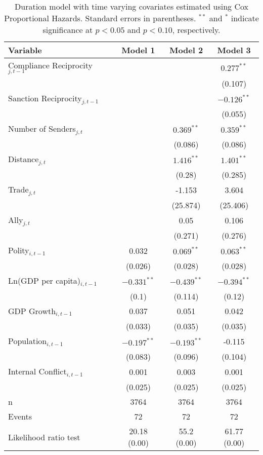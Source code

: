 \begin{table}[ht]
\centering
{\normalsize
\begin{tabular}{lccc}
 Variable & Model 1 & Model 2 & Model 3 \\ 
  \hline
\hline
Compliance Reciprocity$_{j,t-1}$ &  &  & $0.277^{\ast\ast}$ \\ 
   &  &  & (0.107) \\ 
  Sanction Reciprocity$_{j,t-1}$ &  &  & $-0.126^{\ast\ast}$ \\ 
   &  &  & (0.055) \\ 
   \hline
Number of Senders$_{j,t}$ &  & $0.369^{\ast\ast}$ & $0.359^{\ast\ast}$ \\ 
   &  & (0.086) & (0.086) \\ 
  Distance$_{j,t}$ &  & $1.416^{\ast\ast}$ & $1.401^{\ast\ast}$ \\ 
   &  & (0.28) & (0.285) \\ 
  Trade$_{j,t}$ &  & -1.153 & 3.604 \\ 
   &  & (25.874) & (25.406) \\ 
  Ally$_{j,t}$ &  & 0.05 & 0.106 \\ 
   &  & (0.271) & (0.276) \\ 
   \hline
Polity$_{i,t-1}$ & 0.032 & $0.069^{\ast\ast}$ & $0.063^{\ast\ast}$ \\ 
   & (0.026) & (0.028) & (0.028) \\ 
  Ln(GDP per capita)$_{i,t-1}$ & $-0.331^{\ast\ast}$ & $-0.439^{\ast\ast}$ & $-0.394^{\ast\ast}$ \\ 
   & (0.1) & (0.114) & (0.12) \\ 
  GDP Growth$_{i,t-1}$ & 0.037 & 0.051 & 0.042 \\ 
   & (0.033) & (0.035) & (0.035) \\ 
  Population$_{i,t-1}$ & $-0.197^{\ast\ast}$ & $-0.193^{\ast\ast}$ & -0.115 \\ 
   & (0.083) & (0.096) & (0.104) \\ 
  Internal Conflict$_{i,t-1}$ & 0.001 & 0.003 & 0.001 \\ 
   & (0.025) & (0.025) & (0.025) \\ 
   \hline
n & 3764 & 3764 & 3764 \\ 
  Events & 72 & 72 & 72 \\ 
  Likelihood ratio test & 20.18 (0.00) & 55.2 (0.00) & 61.77 (0.00) \\ 
   \hline
\hline
\end{tabular}
}
\caption{Duration model with time varying covariates estimated using Cox Proportional Hazards. Standard errors in parentheses. $^{**}$ and $^{*}$ indicate significance at $p< 0.05 $ and $p< 0.10 $, respectively.} 
\label{tab:regResults}
\end{table}
